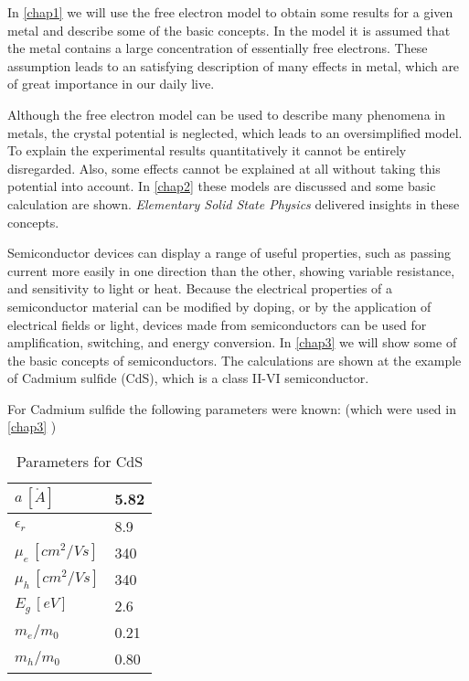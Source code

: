 In \ref{chap1}  we will use the free electron model to obtain some results for a given metal and describe some of the basic concepts. In the model it is assumed that the metal contains a large concentration of essentially free electrons. These assumption leads to an satisfying description of many effects in metal, which are of great importance in our daily live.

Although the free electron model can be used to describe many phenomena in metals, the crystal
potential is neglected, which leads to an oversimplified model. To explain the experimental results quantitatively it cannot be entirely disregarded. Also, some effects cannot be explained at all without taking this potential into account. In \ref{chap2}  these models are discussed and some basic calculation are shown. \textit{Elementary Solid State Physics} \cite{elementary_SSP} delivered insights in these concepts.

Semiconductor devices can display a range of useful properties, such as passing current more easily in one direction than the other, showing variable resistance, and sensitivity to light or heat. Because the electrical properties of a semiconductor material can be modified by doping, or by the application of electrical fields or light, devices made from semiconductors can be used for amplification, switching, and energy conversion. In \ref{chap3}  we will show some of the basic concepts of semiconductors. The calculations are shown at the example of Cadmium sulfide (CdS), which is a class II-VI semiconductor.  


For Cadmium sulfide the following parameters were known:
(which were used in \ref{chap3}  )

\begin{table}[h]
    \centering
    \begin{tabular}{l|l}
     $a \, [\mathring{A}]$      & 5.82 \\ \hline
     $\epsilon_r$               & 8.9  \\ \hline
     $\mu_e \, [cm^2/Vs]$       & 340  \\ \hline
     $\mu_h \, [cm^2/Vs]$       & 340  \\ \hline
     $E_g \, [eV]$              & 2.6  \\ \hline
     $m_e/m_0$                  & 0.21 \\ \hline
     $m_h/m_0$                  & 0.80 \\ 
    \end{tabular}
    \caption{Parameters for CdS}
    \label{tab:CdS_Para}
\end{table}
